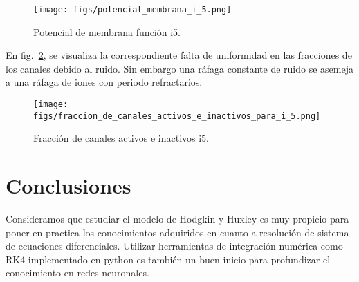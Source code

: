 \documentclass[aps,prl,twocolumn,groupedaddress]{revtex4-2}
\begin{document}
\begin{figure}[h!]
\centering
\texttt{[image: figs/potencial\_membrana\_i\_5.png]}
\caption{Potencial de membrana función i5. \label{fig9}}
\end{figure}


En fig.~\ref{fig10}, se visualiza la correspondiente falta de uniformidad en las fracciones de los canales debido al ruido. Sin embargo una ráfaga constante de ruido se asemeja a una ráfaga de iones con periodo refractarios.\\


\begin{figure}[h!]
\centering
\texttt{[image: figs/fraccion\_de\_canales\_activos\_e\_inactivos\_para\_i\_5.png]}
\caption{Fracción de canales activos e inactivos i5. \label{fig10}}
\end{figure}


\section{Conclusiones}

Consideramos que estudiar el modelo de Hodgkin y Huxley es muy propicio para poner en practica los conocimientos adquiridos en cuanto a resolución de sistema de ecuaciones diferenciales. Utilizar herramientas de integración numérica como RK4 implementado en python es también un buen inicio para profundizar el conocimiento en redes neuronales.

 \\



%
\end{document}
